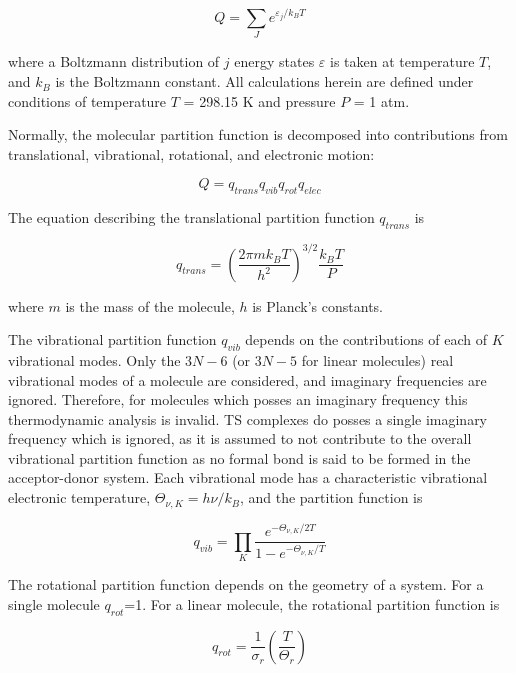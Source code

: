 \begin{equation}
  Q = \sum_J e^{\varepsilon_j/k_B T}
\end{equation}

\noindent where a Boltzmann distribution of $j$ energy states $\varepsilon$ is taken at temperature $T$, and $k_B$ is the Boltzmann constant. All calculations herein are defined under conditions of temperature $T$ = 298.15 K and pressure $P$ = 1 atm.

Normally, the molecular partition function is decomposed into contributions from translational, vibrational, rotational, and electronic motion:

\begin{equation}
  Q = q_{trans}q_{vib}q_{rot}q_{elec}
\end{equation}

\noindent The equation describing the translational partition function
$q_{trans}$ is

\begin{equation}
  q_{trans} = \left( \frac{2\pi m k_B T}{h^2} \right)^{3/2} \frac{k_B T}{P}
\end{equation}

\noindent where $m$ is the mass of the molecule, $h$ is Planck's constants.

The vibrational partition function $q_{vib}$ depends on the contributions of each of $K$ vibrational modes. Only the $3N-6$ (or $3N-5$ for linear molecules) real vibrational modes of a molecule are considered, and imaginary frequencies are ignored. Therefore, for molecules which posses an imaginary frequency this thermodynamic analysis is invalid. TS complexes do posses a single imaginary frequency which is ignored, as it is assumed to not contribute to the overall vibrational partition function as no formal bond is said to be formed in the acceptor-donor system. Each vibrational mode has a characteristic vibrational electronic temperature, $\Theta_{\nu,K} = h\nu/k_B$, and the partition function is

\begin{equation}
  q_{vib} = \prod_K \frac{e^{-\Theta_{\nu,K}/2T}}{1 - e^{-\Theta_{\nu,K}/T}}
\end{equation}

The rotational partition function depends on the geometry of a system. For a single molecule $q_{rot}$=1. For a linear molecule, the rotational partition function is

\begin{equation}
  q_{rot} = \frac{1}{\sigma_r} \left(\frac{T}{\Theta_r}\right)
\end{equation}

